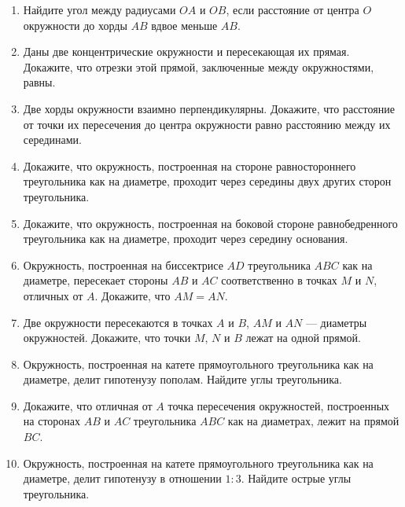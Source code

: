\documentclass[12pt, a4paper]{article}
\begin{document}
	
	   \cfoot{}
	\begin{enumerate}
		\item Найдите угол между радиусами $OA$ и $OB$, если расстояние от центра $O$ окружности до хорды $AB$ вдвое меньше $AB$.
		\item Даны две концентрические окружности и пересекающая их прямая. Докажите, что отрезки этой прямой, заключенные между окружностями, равны.
		\item Две хорды окружности взаимно перпендикулярны. Докажите, что расстояние от точки их пересечения до центра окружности равно расстоянию между их серединами.
		\item Докажите, что окружность, построенная на стороне равностороннего треугольника как на диаметре, проходит через середины двух других сторон треугольника.
		\item Докажите, что окружность, построенная на боковой стороне равнобедренного треугольника как на диаметре, проходит через середину основания.
		\item Окружность, построенная на биссектрисе $AD$ треугольника $ABC$ как на диаметре, пересекает стороны $AB$ и $AC$ соответственно в точках $M$ и $N$, отличных от $A$. Докажите, что $AM = AN$.
		\item Две окружности пересекаются в точках $A$ и $B$, $AM$ и $AN$ — диаметры окружностей. Докажите, что точки $M$, $N$ и $B$ лежат на одной прямой.
		\item Окружность, построенная на катете прямоугольного треугольника как на диаметре, делит гипотенузу пополам. Найдите углы треугольника.
		\item Докажите, что отличная от $A$ точка пересечения окружностей, построенных на сторонах $AB$ и $AC$ треугольника $ABC$ как на диаметрах, лежит на прямой $BC$.
		\item Окружность, построенная на катете прямоугольного треугольника как на диаметре, делит гипотенузу в отношении $1 : 3$. Найдите острые углы треугольника.
	\end{enumerate}
\end{document}
